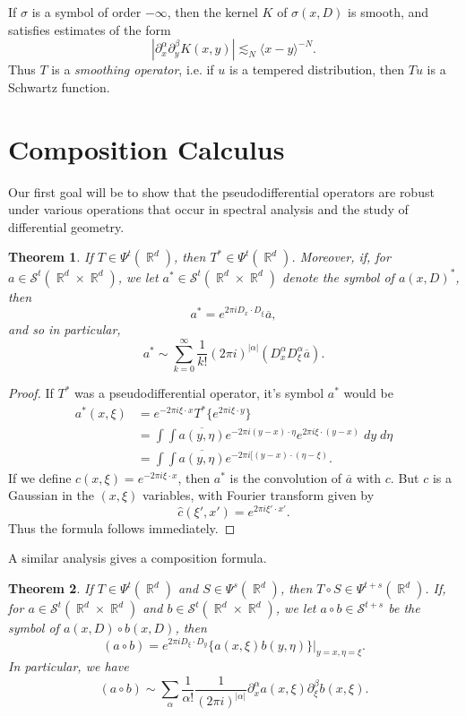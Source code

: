 \documentclass{article}
\DeclareMathOperator{\RR}{\mathbb{R}}
\theoremstyle{plain}
\newtheorem{theorem}{Theorem}
\theoremstyle{definition}
\begin{document}
If $\sigma$ is a symbol of order $-\infty$, then the kernel $K$ of $\sigma(x,D)$ is smooth, and satisfies estimates of the form
%
\[ |\partial_x^\alpha \partial_y^\beta K(x,y)| \lesssim_N \langle x - y \rangle^{-N}. \]
%
Thus $T$ is a \emph{smoothing operator}, i.e. if $u$ is a tempered distribution, then $Tu$ is a Schwartz function.

\section{Composition Calculus}

Our first goal will be to show that the pseudodifferential operators are robust under various operations that occur in spectral analysis and the study of differential geometry.

\begin{theorem}
    If $T \in \Psi^t(\RR^d)$, then $T^* \in \Psi^t(\RR^d)$. Moreover, if, for $a \in \mathcal{S}^t(\RR^d \times \RR^d)$, we let $a^* \in \mathcal{S}^t(\RR^d \times \RR^d)$ denote the symbol of $a(x,D)^*$, then
    \[ a^* = e^{2 \pi i D_x \cdot D_\xi} \overline{a}, \]
    and so in particular,
    \[ a^* \sim \sum_{k = 0}^\infty \frac{1}{k!} (2 \pi i)^{|\alpha|} (D_x^\alpha D_\xi^\alpha \overline{a}). \]
\end{theorem}
\begin{proof}
    If $T^*$ was a pseudodifferential operator, it's symbol $a^*$ would be
    \begin{align*}
        a^*(x,\xi) &= e^{-2 \pi i \xi \cdot x} T^* \{ e^{2 \pi i \xi \cdot y} \}\\
        &= \int \int \overline{a(y,\eta)} e^{-2 \pi i (y - x) \cdot \eta} e^{2 \pi i \xi \cdot (y - x)}\; dy\; d\eta\\
        &= \int \int \overline{a(y,\eta)} e^{- 2 \pi i [( y - x ) \cdot (\eta - \xi)}.
    \end{align*}
    If we define $c(x,\xi) = e^{-2 \pi i \xi \cdot x}$, then $a^*$ is the convolution of $\overline{a}$ with $c$. But $c$ is a Gaussian in the $(x,\xi)$ variables, with Fourier transform given by
    \[ \widehat{c}(\xi',x') = e^{2 \pi i \xi' \cdot x'}. \]
    Thus the formula follows immediately.
\end{proof}

A similar analysis gives a composition formula.

\begin{theorem}
    If $T \in \Psi^t(\RR^d)$ and $S \in \Psi^s(\RR^d)$, then $T \circ S \in \Psi^{t + s}(\RR^d)$. If, for $a \in \mathcal{S}^t(\RR^d \times \RR^d)$ and $b \in \mathcal{S}^t(\RR^d \times \RR^d)$, we let $a \circ b \in \mathcal{S}^{t + s}$ be the symbol of $a(x,D) \circ b(x,D)$, then
    \[ (a \circ b) = e^{2 \pi i D_\xi \cdot D_y} \{ a(x,\xi) b(y,\eta) \} |_{y = x, \eta = \xi}. \]
    In particular, we have
    \[ (a \circ b) \sim \sum_\alpha \frac{1}{\alpha!} \frac{1}{(2 \pi i)^{|\alpha|}} \partial_x^\alpha a(x,\xi) \partial_\xi^\beta b(x,\xi). \]
\end{theorem}
\end{document}
